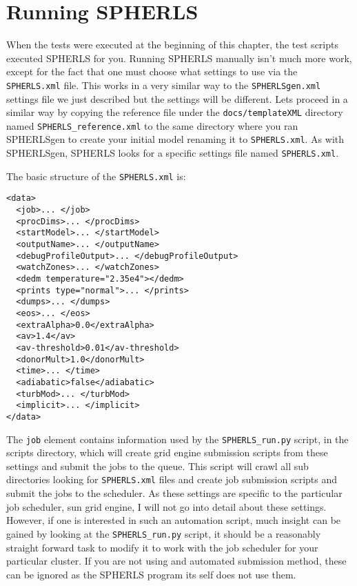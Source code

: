 \documentclass[12pt,a4paper]{book}
\begin{document}
\section{Running SPHERLS}
\label{sec:running}
When the tests were executed at the beginning of this chapter, the test scripts executed SPHERLS for you. Running SPHERLS manually isn't much more work, except for the fact that one must choose what settings to use via the {\tt SPHERLS.xml} file. This works in a very similar way to the {\tt SPHERLSgen.xml} settings file we just described but the settings will be different. Lets proceed in a similar way by copying the reference file under the {\tt docs/templateXML} directory named {\tt SPHERLS\_reference.xml} to the same directory where you ran SPHERLSgen to create your initial model renaming it to {\tt SPHERLS.xml}. As with SPHERLSgen, SPHERLS looks for a specific settings file named {\tt SPHERLS.xml}.

The basic structure of the {\tt SPHERLS.xml} is:

\begin{verbatim}
<data>
  <job>... </job>
  <procDims>... </procDims>
  <startModel>... </startModel>
  <outputName>... </outputName>
  <debugProfileOutput>... </debugProfileOutput>
  <watchZones>... </watchZones>
  <dedm temperature="2.35e4"></dedm>
  <prints type="normal">... </prints>
  <dumps>... </dumps>
  <eos>... </eos>
  <extraAlpha>0.0</extraAlpha>
  <av>1.4</av>
  <av-threshold>0.01</av-threshold>
  <donorMult>1.0</donorMult>
  <time>... </time>
  <adiabatic>false</adiabatic>
  <turbMod>... </turbMod>
  <implicit>... </implicit>
</data>
\end{verbatim}

The {\tt job} element contains information used by the {\tt SPHERLS\_run.py} script, in the scripts directory, which will create grid engine submission scripts from these settings and submit the jobs to the queue. This script will crawl all sub directories looking for {\tt SPHERLS.xml} files and create job submission scripts and submit the jobs to the scheduler. As these settings are specific to the particular job scheduler, sun grid engine, I will not go into detail about these settings. However, if one is interested in such an automation script, much insight can be gained by looking at the {\tt SPHERLS\_run.py} script, it should be a reasonably straight forward task to modify it to work with the job scheduler for your particular cluster. If you are not using and automated submission method, these can be ignored as the SPHERLS program its self does not use them.
\end{document}
